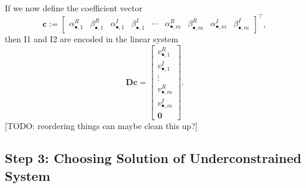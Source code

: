 \documentclass[11pt]{article}
\newcommand{\bD}{\bm D}
\newcommand{\bc}{\bm c}
\begin{document}
If we now define the coefficient vector
\begin{equation}
    \bc := \left[\begin{array}{ccccccccc} \alpha_{\bullet, 1}^R & \beta_{\bullet, 1}^R & \alpha_{\bullet, 1}^I & \beta_{\bullet, 1}^I & \cdots & \alpha_{\bullet, m}^R & \beta_{\bullet, m}^R & \alpha_{\bullet, m}^I & \beta_{\bullet, m}^I \end{array} \right]^\top,
\end{equation}
then I1 and I2 are encoded in the linear system
\begin{equation}
    \bD\bc = \left[\begin{array}{c} v_{\bullet, 1}^R \\ v_{\bullet, 1}^I \\ \vdots \\ v_{\bullet, m}^R \\ v_{\bullet, m}^I \\ \bm 0 \end{array}\right].
\end{equation}
[TODO: reordering things can maybe clean this up?]

\subsection{Step 3: Choosing Solution of Underconstrained System}





\end{document}
